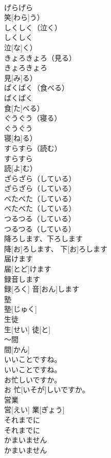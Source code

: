 \documentclass[8pt]{extreport}
\begin{document}
\begin{CJK}{UTF8}{min}
\\	げらげら
\\	笑[わら]う）		
\\	しくしく（泣く）	
\\	しくしく
\\	泣[な]く）		
\\	きょろきょろ（見る）	
\\	きょろきょろ
\\	見[み]る）		
\\	ぱくぱく（食べる）	
\\	ぱくぱく
\\	食[た]べる）		
\\	ぐうぐう（寝る）	
\\	ぐうぐう
\\	寝[ね]る）		
\\	すらすら（読む）	
\\	すらすら
\\	読[よ]む）		
\\	ざらざら（している）	
\\	ざらざら（している）		
\\	べたべた（している）	
\\	べたべた（している）		
\\	つるつる（している）	
\\	つるつる（している）		
\\	降ろします、下ろします	
\\	降[お]ろします、 下[お]ろします		
\\	届けます	
\\	届[とど]けます		
\\	録音します	
\\	録[ろく] 音[おん]します		
\\	塾	
\\	塾[じゅく]		
\\	生徒	
\\	生[せい] 徒[と]		
\\	～間	
\\	間[かん]		
\\	いいことですね。	
\\	いいことですね。		
\\	お忙しいですか。	
\\	お 忙[いそが]しいですか。		
\\	営業	
\\	営[えい] 業[ぎょう]		
\\	それまでに	
\\	それまでに		
\\	かまいません	
\\	かまいません		

\end{CJK}
\end{document}
